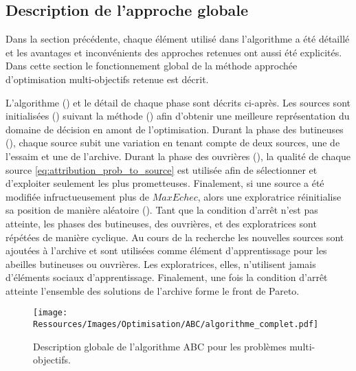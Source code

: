 \subsection{Description de l’approche globale} %
\label{sub:description_de_l_approche_globale}
Dans la section précédente, chaque élément utilisé dans l’algorithme a été détaillé et
les avantages et inconvénients des approches retenues ont aussi été explicités.
Dans cette section le fonctionnement global de la méthode approchée d’optimisation
multi-objectifs retenue est décrit.

L’algorithme () et le détail de chaque phase sont décrits ci-après.
Les sources sont initialisées () suivant la méthode
 () afin d’obtenir une meilleure représentation du
domaine de décision en amont de l’optimisation.
Durant la phase des butineuses (), chaque source
subit une variation en tenant compte de deux sources, une de l’essaim et une de l’archive.
Durant la phase des ouvrières (), la qualité de
chaque source \eqref{eq:attribution_prob_to_source} est utilisée afin de sélectionner
et d’exploiter seulement les plus prometteuses. Finalement, si une source a été
modifiée infructueusement plus de $MaxEchec$, alors une exploratrice
réinitialise sa position de manière aléatoire  ().
Tant que la condition d’arrêt n’est pas atteinte, les phases des butineuses,
des ouvrières, et des exploratrices sont répétées de manière cyclique. Au cours de
la recherche les nouvelles sources sont ajoutées à l’archive et sont utilisées
comme élément d’apprentissage pour les abeilles butineuses ou ouvrières. Les
exploratrices, elles, n’utilisent jamais d’éléments sociaux d’apprentissage.
Finalement, une fois la condition d’arrêt atteinte l’ensemble des solutions
de l’archive forme le front de Pareto.

\begin{figure}
    \centering
    \texttt{[image: Ressources/Images/Optimisation/ABC/algorithme\_complet.pdf]}
    \caption[Description globale de l’algorithme ABC pour les problèmes multi-objectifs]
            {Description globale de l’algorithme ABC pour les problèmes multi-objectifs.}
    \label{fig:abc_complet}
\end{figure}


